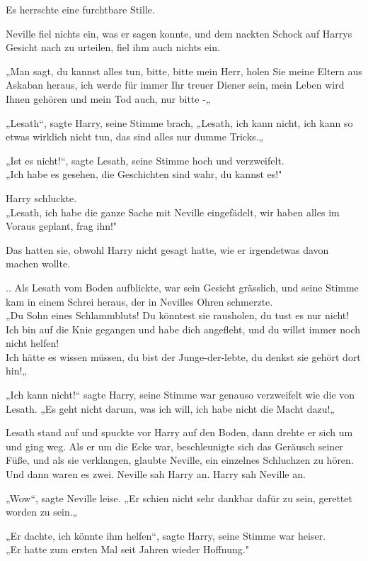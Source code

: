 {Es herrschte eine furchtbare Stille.

Neville fiel nichts ein, was er sagen konnte, und dem nackten Schock auf Harrys Gesicht nach zu urteilen, fiel ihm auch nichts ein.

„Man sagt, du kannst alles tun, bitte, bitte mein Herr, holen Sie meine Eltern aus Askaban heraus, ich werde für immer Ihr treuer Diener sein, mein Leben wird Ihnen gehören und mein Tod auch, nur bitte -„

„Lesath“, sagte Harry, seine Stimme brach, „Lesath, ich kann nicht, ich kann so etwas wirklich nicht tun, das sind alles nur dumme Tricks.„

„Ist es nicht!“, sagte Lesath, seine Stimme hoch und verzweifelt.\\ „Ich habe es gesehen, die Geschichten sind wahr, du kannst es!"

Harry schluckte.\\ „Lesath, ich habe die ganze Sache mit Neville eingefädelt, wir haben alles im Voraus geplant, frag ihn!"

Das hatten sie, obwohl Harry nicht gesagt hatte, wie er irgendetwas davon machen wollte.

.. Als Lesath vom Boden aufblickte, war sein Gesicht grässlich, und seine Stimme kam in einem Schrei heraus, der in Nevilles Ohren schmerzte.\\ „Du Sohn eines Schlammbluts! Du könntest sie rausholen, du tust es nur nicht! Ich bin auf die Knie gegangen und habe dich angefleht, und du willst immer noch nicht helfen!\\ Ich hätte es wissen müssen, du bist der Junge-der-lebte, du denkst sie gehört dort hin!„

„Ich kann nicht!“ sagte Harry, seine Stimme war genauso verzweifelt wie die von Lesath. „Es geht nicht darum, was ich will, ich habe nicht die Macht dazu!„

Lesath stand auf und spuckte vor Harry auf den Boden, dann drehte er sich um und ging weg. Als er um die Ecke war, beschleunigte sich das Geräusch seiner Füße, und als sie verklangen, glaubte Neville, ein einzelnes Schluchzen zu hören.\\ Und dann waren es zwei. Neville sah Harry an. Harry sah Neville an.

„Wow“, sagte Neville leise. „Er schien nicht sehr dankbar dafür zu sein, gerettet worden zu sein.„

„Er dachte, ich könnte ihm helfen“, sagte Harry, seine Stimme war heiser.\\ „Er hatte zum ersten Mal seit Jahren wieder Hoffnung."

}
